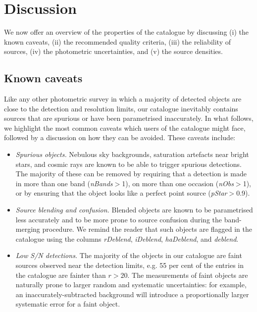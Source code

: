 \documentclass[a4paper,useAMS,usenatbib]{mn2e}
\begin{document}

\section{Discussion}
\label{sec:discussion}

{\bf

We now offer an overview of the properties of the
catalogue by discussing 
(i) the known caveats,
(ii) the recommended quality criteria,
(iii) the reliability of sources,
(iv) the photometric uncertainties,
and (v) the source densities.

\subsection{Known caveats}

Like any other photometric survey
in which a majority of detected objects are close
to the detection and resolution limits,
our catalogue inevitably contains sources
that are spurious or have been parametrised inaccurately.
In what follows, we highlight the most common
caveats which users of the catalogue might face,
followed by a discussion on how they can be avoided.
These caveats include:
\begin{itemize}
\item \emph{Spurious objects.}
Nebulous sky backgrounds,
saturation artefacts near bright stars,
and cosmic rays
are known to be able to trigger spurious detections.
The majority of these can be removed by requiring
that a detection is made in more than one band
(\emph{nBands}$>$1),
on more than one occasion (\emph{nObs}$>$1),
or by ensuring that the object looks like a perfect
point source (\emph{pStar}$>$0.9).
\item \emph{Source blending and confusion.}
Blended objects are known to be parametrised less accurately
and to be more prone 
to source confusion
during the band-merging procedure.
We remind the reader that such objects are flagged in the catalogue
using the columns \emph{rDeblend}, \emph{iDeblend},
\emph{haDeblend}, and \emph{deblend}.
\item \emph{Low S/N detections.}
The majority of the objects in our catalogue
are faint sources observed near the detection limits,
e.g. 55 per cent of the entries in the catalogue
are fainter than $r > 20$.
The measurements of faint objects
are naturally prone to larger
random and systematic uncertainties:
for example, an inaccurately-subtracted background
will introduce a proportionally larger systematic error
for a faint object.

\end{itemize}}
\end{document}

